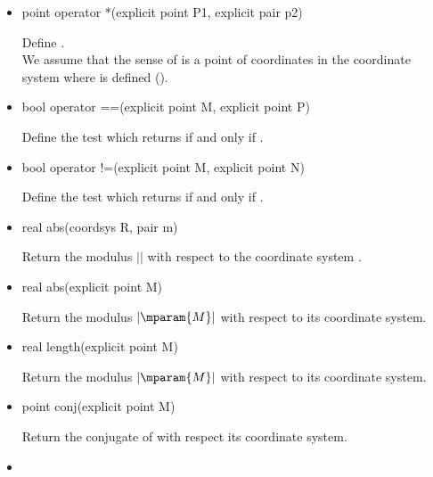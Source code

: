 \documentclass[pdftex]{article}
\begin{document}
\begin{itemize}
\item {}
  \begin{Vcolor}
    point operator *(explicit point P1, explicit pair p2)
  \end{Vcolor}
  Define .\\
  We assume that the sense of   is a point of 
  coordinates in the coordinate system where  is defined ().
\item {}
  \begin{Vcolor}
    bool operator ==(explicit point M, explicit point P)
  \end{Vcolor}
  Define the test   which returns   if and
  only if  .
\item {}
  \begin{Vcolor}
    bool operator !=(explicit point M, explicit point N)
  \end{Vcolor}
  Define the test  which returns  if and only
  if .
\item {}
  \begin{Vcolor}
    real abs(coordsys R, pair m)
  \end{Vcolor}
  Return the modulus $\vert$$\vert$ with respect to the
  coordinate system .
\item {}
  \begin{Vcolor}
    real abs(explicit point M)
  \end{Vcolor}
  Return the modulus  $\vert\mparam{M}\vert$ with respect to its coordinate system.
\item {}
  \begin{Vcolor}
    real length(explicit point M)
  \end{Vcolor}
  Return the modulus  $\vert\mparam{M}\vert$  with respect to its coordinate system.
\item {}
  \begin{Vcolor}
    point conj(explicit point M)
  \end{Vcolor}
  Return the conjugate of  with respect its coordinate
  system.
\item {}

\end{itemize}
\end{document}
